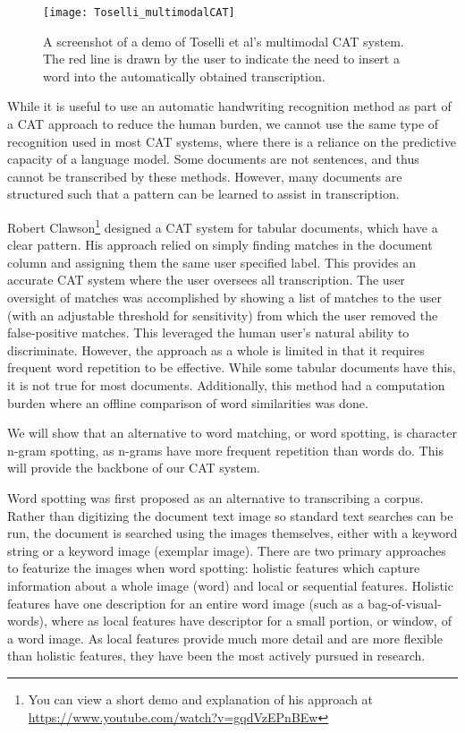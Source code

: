 \documentclass[ms]{byuprop}
\begin{document}
\begin{figure}[h]
    \centering
    \texttt{[image: Toselli\_multimodalCAT]}
    \caption{A screenshot of a demo of Toselli et al's multimodal CAT system. The red line is drawn by the user to indicate the need to insert a word into the automatically obtained transcription.}
    \label{fig:Toselli_multimodalCAT}
\end{figure}

While it is useful to use an automatic handwriting recognition method as part of a CAT approach to reduce the human burden, we cannot use the same type of recognition used in most CAT systems, where there is a reliance on the predictive capacity of a language model. Some documents are not sentences, and thus cannot be transcribed by these methods. However, many documents are structured such that a pattern can be learned to assist in transcription.

Robert Clawson\cite{Clawson2014}\footnote{You can view a short demo and explanation of his approach at \url{https://www.youtube.com/watch?v=gqdVzEPnBEw}} designed a CAT system for tabular documents, which have a clear pattern. His approach relied on simply finding matches in the document column and assigning them the same user specified label. This provides an accurate CAT system where the user oversees all transcription. The user oversight of matches was accomplished by showing a list of matches to the user (with an adjustable threshold for sensitivity) from which the user removed the false-positive matches. This leveraged the human user's natural ability to discriminate. However, the approach as a whole is limited in that it requires frequent word repetition to be effective. While some tabular documents have this, it is not true for most documents. Additionally, this method had a computation burden where an offline comparison of word similarities was done.

We will show that an alternative to word matching, or word spotting, is character n-gram spotting, as n-grams have more frequent repetition than words do. This will provide the backbone of our CAT system.

Word spotting was first proposed as an alternative to transcribing a corpus. Rather than digitizing the document text image so standard text searches can be run, the document is searched using the images themselves, either with a keyword string or a keyword image (exemplar image). There are two primary approaches to featurize the images when word spotting: holistic features which capture information about a whole image (word) and local or sequential features\cite{Rodrıguez2008}. Holistic features have one description for an entire word image (such as a bag-of-visual-words), where as local features have descriptor for a small portion, or window, of a word image. As local features provide much more detail and are more flexible than holistic features, they have been the most actively pursued in research.
\end{document}
